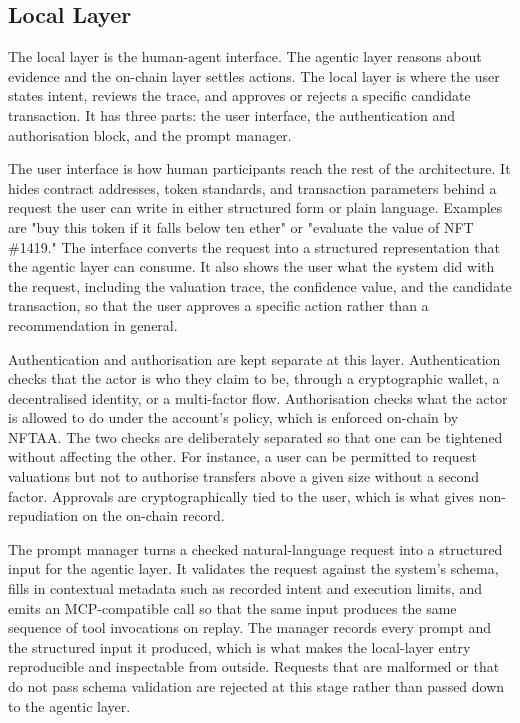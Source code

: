 \subsection{Local Layer}

The local layer is the human-agent interface. The agentic layer reasons about evidence and the on-chain layer settles actions. The local layer is where the user states intent, reviews the trace, and approves or rejects a specific candidate transaction. It has three parts: the user interface, the authentication and authorisation block, and the prompt manager.

The user interface is how human participants reach the rest of the architecture. It hides contract addresses, token standards, and transaction parameters behind a request the user can write in either structured form or plain language. Examples are "buy this token if it falls below ten ether" or "evaluate the value of NFT \#1419." The interface converts the request into a structured representation that the agentic layer can consume. It also shows the user what the system did with the request, including the valuation trace, the confidence value, and the candidate transaction, so that the user approves a specific action rather than a recommendation in general.

Authentication and authorisation are kept separate at this layer. Authentication checks that the actor is who they claim to be, through a cryptographic wallet, a decentralised identity, or a multi-factor flow. Authorisation checks what the actor is allowed to do under the account's policy, which is enforced on-chain by NFTAA. The two checks are deliberately separated so that one can be tightened without affecting the other. For instance, a user can be permitted to request valuations but not to authorise transfers above a given size without a second factor. Approvals are cryptographically tied to the user, which is what gives non-repudiation on the on-chain record.

The prompt manager turns a checked natural-language request into a structured input for the agentic layer. It validates the request against the system's schema, fills in contextual metadata such as recorded intent and execution limits, and emits an MCP-compatible call so that the same input produces the same sequence of tool invocations on replay. The manager records every prompt and the structured input it produced, which is what makes the local-layer entry reproducible and inspectable from outside. Requests that are malformed or that do not pass schema validation are rejected at this stage rather than passed down to the agentic layer.

